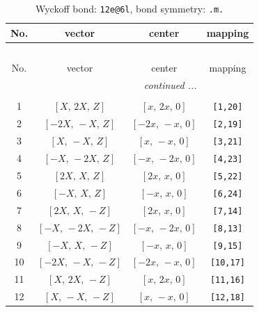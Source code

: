 \documentclass[fleqn,8pt]{jsarticle}
\begin{document}
\begin{longtable}{cccc}
\caption{Wyckoff bond: {\tt 12e@6l}, bond symmetry: {\tt .m.}}
 \\
 \hline \hline
No. & vector & center & mapping \\ \hline \endfirsthead

\multicolumn{3}{l}{\tablename\ \thetable{}} \\
 \hline \hline
No. & vector & center & mapping \\ \hline \endhead

 \hline \hline
\multicolumn{3}{r}{\footnotesize\it continued ...} \\ \endfoot

 \hline \hline
\multicolumn{3}{r}{} \\ \endlastfoot

1 & $\left[ X,\, 2 X,\, Z \right]$ & $\left[ x,\, 2 x,\, 0 \right]$ & {\tt [1,20]} \\ \hline
2 & $\left[ - 2 X,\, - X,\, Z \right]$ & $\left[ - 2 x,\, - x,\, 0 \right]$ & {\tt [2,19]} \\ \hline
3 & $\left[ X,\, - X,\, Z \right]$ & $\left[ x,\, - x,\, 0 \right]$ & {\tt [3,21]} \\ \hline
4 & $\left[ - X,\, - 2 X,\, Z \right]$ & $\left[ - x,\, - 2 x,\, 0 \right]$ & {\tt [4,23]} \\ \hline
5 & $\left[ 2 X,\, X,\, Z \right]$ & $\left[ 2 x,\, x,\, 0 \right]$ & {\tt [5,22]} \\ \hline
6 & $\left[ - X,\, X,\, Z \right]$ & $\left[ - x,\, x,\, 0 \right]$ & {\tt [6,24]} \\ \hline
7 & $\left[ 2 X,\, X,\, - Z \right]$ & $\left[ 2 x,\, x,\, 0 \right]$ & {\tt [7,14]} \\ \hline
8 & $\left[ - X,\, - 2 X,\, - Z \right]$ & $\left[ - x,\, - 2 x,\, 0 \right]$ & {\tt [8,13]} \\ \hline
9 & $\left[ - X,\, X,\, - Z \right]$ & $\left[ - x,\, x,\, 0 \right]$ & {\tt [9,15]} \\ \hline
10 & $\left[ - 2 X,\, - X,\, - Z \right]$ & $\left[ - 2 x,\, - x,\, 0 \right]$ & {\tt [10,17]} \\ \hline
11 & $\left[ X,\, 2 X,\, - Z \right]$ & $\left[ x,\, 2 x,\, 0 \right]$ & {\tt [11,16]} \\ \hline
12 & $\left[ X,\, - X,\, - Z \right]$ & $\left[ x,\, - x,\, 0 \right]$ & {\tt [12,18]} \\
\end{longtable}
\renewcommand{\arraystretch}{1.2}
\end{document}
